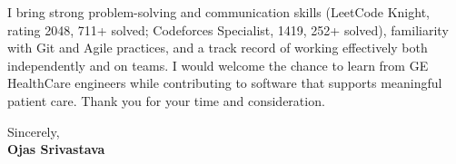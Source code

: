 \documentclass[a4paper,11pt]{article}
\begin{document}
I bring strong problem-solving and communication skills (LeetCode Knight, rating 2048, 711+ solved; Codeforces Specialist, 1419, 252+ solved), familiarity with Git and Agile practices, and a track record of working effectively both independently and on teams. I would welcome the chance to learn from GE HealthCare engineers while contributing to software that supports meaningful patient care. Thank you for your time and consideration.

Sincerely, \\
\vspace{8mm}
\textbf{Ojas Srivastava}
\end{document}
